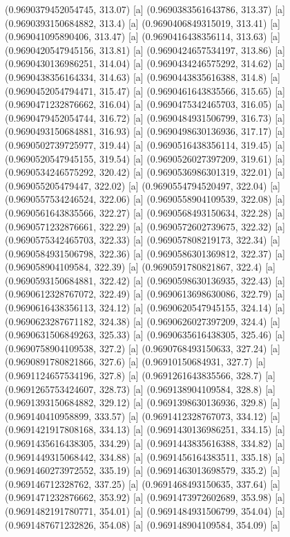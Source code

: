 {{{(0.9690379452054745, 313.07) [a] 
(0.9690383561643786, 313.37) [a] 
(0.9690393150684882, 313.4) [a] 
(0.9690406849315019, 313.41) [a] 
(0.969041095890406, 313.47) [a] 
(0.9690416438356114, 313.63) [a] 
(0.9690420547945156, 313.81) [a] 
(0.9690424657534197, 313.86) [a] 
(0.9690430136986251, 314.04) [a] 
(0.9690434246575292, 314.62) [a] 
(0.9690438356164334, 314.63) [a] 
(0.9690443835616388, 314.8) [a] 
(0.9690452054794471, 315.47) [a] 
(0.9690461643835566, 315.65) [a] 
(0.9690471232876662, 316.04) [a] 
(0.9690475342465703, 316.05) [a] 
(0.9690479452054744, 316.72) [a] 
(0.9690484931506799, 316.73) [a] 
(0.9690493150684881, 316.93) [a] 
(0.9690498630136936, 317.17) [a] 
(0.9690502739725977, 319.44) [a] 
(0.9690516438356114, 319.45) [a] 
(0.9690520547945155, 319.54) [a] 
(0.9690526027397209, 319.61) [a] 
(0.9690534246575292, 320.42) [a] 
(0.9690536986301319, 322.01) [a] 
(0.969055205479447, 322.02) [a] 
(0.9690554794520497, 322.04) [a] 
(0.9690557534246524, 322.06) [a] 
(0.9690558904109539, 322.08) [a] 
(0.9690561643835566, 322.27) [a] 
(0.9690568493150634, 322.28) [a] 
(0.9690571232876661, 322.29) [a] 
(0.9690572602739675, 322.32) [a] 
(0.9690575342465703, 322.33) [a] 
(0.969057808219173, 322.34) [a] 
(0.9690584931506798, 322.36) [a] 
(0.9690586301369812, 322.37) [a] 
(0.969058904109584, 322.39) [a] 
(0.9690591780821867, 322.4) [a] 
(0.9690593150684881, 322.42) [a] 
(0.9690598630136935, 322.43) [a] 
(0.9690612328767072, 322.49) [a] 
(0.9690613698630086, 322.79) [a] 
(0.9690616438356113, 324.12) [a] 
(0.9690620547945155, 324.14) [a] 
(0.9690623287671182, 324.38) [a] 
(0.9690626027397209, 324.4) [a] 
(0.9690631506849263, 325.33) [a] 
(0.9690635616438305, 325.46) [a] 
(0.9690758904109538, 327.2) [a] 
(0.9690768493150633, 327.24) [a] 
(0.9690891780821866, 327.6) [a] 
(0.96910150684931, 327.7) [a] 
(0.9691124657534196, 327.8) [a] 
(0.9691261643835566, 328.7) [a] 
(0.9691265753424607, 328.73) [a] 
(0.969138904109584, 328.8) [a] 
(0.9691393150684882, 329.12) [a] 
(0.9691398630136936, 329.8) [a] 
(0.969140410958899, 333.57) [a] 
(0.9691412328767073, 334.12) [a] 
(0.9691421917808168, 334.13) [a] 
(0.9691430136986251, 334.15) [a] 
(0.9691435616438305, 334.29) [a] 
(0.9691443835616388, 334.82) [a] 
(0.9691449315068442, 334.88) [a] 
(0.9691456164383511, 335.18) [a] 
(0.9691460273972552, 335.19) [a] 
(0.9691463013698579, 335.2) [a] 
(0.969146712328762, 337.25) [a] 
(0.9691468493150635, 337.64) [a] 
(0.9691471232876662, 353.92) [a] 
(0.9691473972602689, 353.98) [a] 
(0.9691482191780771, 354.01) [a] 
(0.9691484931506799, 354.04) [a] 
(0.9691487671232826, 354.08) [a] 
(0.969148904109584, 354.09) [a] 
}}}
